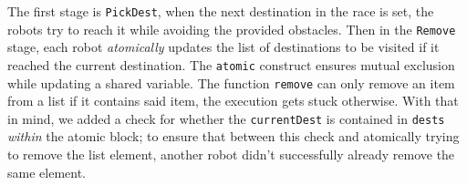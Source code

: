  The first stage is \verb|PickDest|, when the next destination in the race is set, the robots try to reach it while avoiding the provided obstacles. Then in the \verb|Remove| stage, each robot \emph{atomically} updates the list of destinations to be visited if it reached the current destination. The \verb|atomic| construct ensures mutual exclusion while updating a shared variable. The function \verb|remove| can only remove an item from a list if it contains said item, the execution gets stuck otherwise. With that in mind, we added a check for whether the \verb|currentDest| is contained in \verb|dests| \emph{within} the atomic block; to ensure that between this check and atomically trying to remove the list element, another robot didn't successfully already remove the same element. 